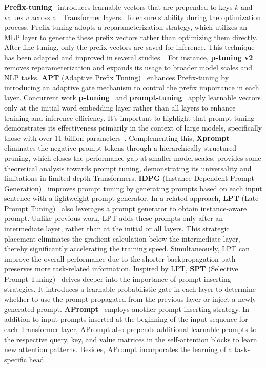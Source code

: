\textbf{Prefix-tuning}~\cite{11-prefix-tuning} introduces learnable vectors that are prepended to keys $k$ and values $v$ across all Transformer layers. To ensure stability during the optimization process, Prefix-tuning adopts a reparameterization strategy, which utilizes an MLP layer to generate these prefix vectors rather than optimizing them directly. After fine-tuning, only the prefix vectors are saved for inference.
This technique has been adapted and improved in several studies~\cite{Prefix-Propagation, 47-P-tuning-v2, zhang2023towards}. For instance, \textbf{p-tuning v2}~\cite{47-P-tuning-v2} removes reparameterization and expands its usage to broader model scales and NLP tasks. \textbf{APT} (Adaptive Prefix Tuning)~\cite{zhang2023towards} enhances Prefix-tuning by introducing an adaptive gate mechanism to control the prefix importance in each layer. 
Concurrent work \textbf{p-tuning}~\cite{3-GPT-understands-too} and \textbf{prompt-tuning}~\cite{13-prompt-tuning} apply learnable vectors only at the initial word embedding layer rather than all layers to enhance training and inference efficiency. 
It's important to highlight that prompt-tuning demonstrates its effectiveness primarily in the context of large models, specifically those with over 11 billion parameters~\cite{13-prompt-tuning}. Complementing this, \textbf{Xprompt}~\cite{xprompt} eliminates the negative prompt tokens through a hierarchically structured pruning, which closes the performance gap at smaller model scales. \textbf{\cite{wang2023universality}} provides some theoretical analysis towards prompt tuning, demonstrating its universality and limitations in limited-depth Transformers.
\textbf{IDPG} (Instance-Dependent Prompt Generation)~\cite{IDPG} improves prompt tuning by generating prompts based on each input sentence with a lightweight prompt generator.
In a related approach, \textbf{LPT} (Late Prompt Tuning)~\cite{LPT} also leverages a prompt generator to obtain instance-aware prompt. Unlike previous work, LPT adds these prompts only after an intermediate layer, rather than at the initial or all layers. This strategic placement eliminates the gradient calculation below the intermediate layer, thereby significantly accelerating the training speed. Simultaneously, LPT can improve the overall performance due to the shorter backpropagation path preserves more task-related information.
Inspired by LPT, \textbf{SPT} (Selective Prompt Tuning)~\cite{SPT} delves deeper into the importance of prompt inserting strategies. It introduces a learnable probabilistic gate in each layer to determine whether to use the prompt propagated from the previous layer or inject a newly generated prompt. 
\textbf{APrompt}~\cite{Aprompt} employs another prompt inserting strategy. In addition to input prompts inserted at the beginning of the input sequence for each Transformer layer, APrompt also prepends additional learnable prompts to the respective query, key, and value matrices in the self-attention blocks to learn new attention patterns. Besides, APrompt incorporates the learning of a task-specific head.



